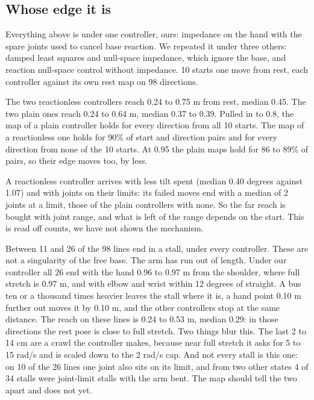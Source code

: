 \documentclass[pdflatex,sn-mathphys-num]{sn-jnl}
\begin{document}
\subsection{Whose edge it is}
Everything above is under one controller, ours: impedance on the hand with the spare joints used to cancel base
reaction. We repeated it under three others: damped least squares and null-space impedance, which ignore the base,
and reaction null-space control without impedance. 10 starts one move from rest, each controller against its own
rest map on 98 directions. %

The two reactionless controllers reach 0.24 to 0.75 m from rest, median 0.45. The two plain ones reach 0.24 to
0.64 m, median 0.37 to 0.39. Pulled in to 0.8, the map of a plain controller holds for every direction from all
10 starts. The map of a reactionless one holds for 90\% of start and direction pairs and for every direction from
none of the 10 starts. At 0.95 the plain maps hold for 86 to 89\% of pairs, so their edge moves too, by less.

A reactionless controller arrives with less tilt spent (median 0.40 degrees against 1.07) and with joints on their
limits: its failed moves end with a median of 2 joints at a limit, those of the plain controllers with none. So the
far reach is bought with joint range, and what is left of the range depends on the start. This is read off counts,
we have not shown the mechanism.

Between 11 and 26 of the 98 lines end in a stall, under every controller. These are not a singularity of the free
base. The arm has run out of length. Under our controller all 26 end with the hand 0.96 to 0.97 m from the shoulder,
where full stretch is 0.97 m, and with elbow and wrist within 12 degrees of straight. A bus ten or a thousand times
heavier leaves the stall where it is, a hand point 0.10 m further out moves it by 0.10 m, and the other controllers
stop at the same distance. The reach on these lines is 0.24 to 0.53 m, median 0.29: in those directions the rest
pose is close to full stretch. Two things blur this. The last 2 to 14 cm are a crawl the controller makes, because
near full stretch it asks for 5 to 15 rad/s and is scaled down to the 2 rad/s cap. And not every stall is this one:
on 10 of the 26 lines one joint also sits on its limit, and from two other states 4 of 34 stalls were joint-limit
stalls with the arm bent. The map should tell the two apart and does not yet. %
\end{document}

